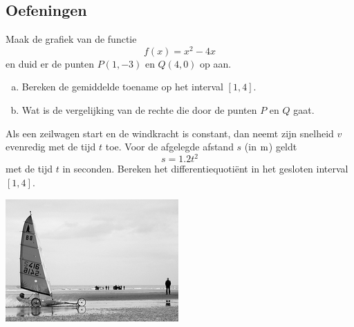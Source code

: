 \documentclass[12pt]{article}
\begin{document}
\begin{theorie}

\subsection{Oefeningen}

\end{theorie}

\begin{oefening}
  Maak de grafiek van de functie
  $$f(x)=x^2-4x$$
  en duid er de punten $P(1,-3)$ en $Q(4,0)$ op aan.
  \begin{enumerate}[(a)]
  \item Bereken de gemiddelde toename op het interval $[1,4]$.
  \item Wat is de vergelijking van de rechte die door de punten $P$ en $Q$ gaat.
  \end{enumerate}
\end{oefening}

\begin{oefening}
  Als een zeilwagen start en de windkracht is constant, dan neemt zijn snelheid $v$ evenredig met de tijd $t$ toe. Voor de afgelegde afstand $s$ (in $\m$) geldt
  $$s=1.2t^2$$
  met de tijd $t$ in seconden. Bereken het differentiequotiënt in het gesloten interval $[1,4]$.
  \begin{center}
    \includegraphics{zeilwagen}
  \end{center}
\end{oefening}
\end{document}
